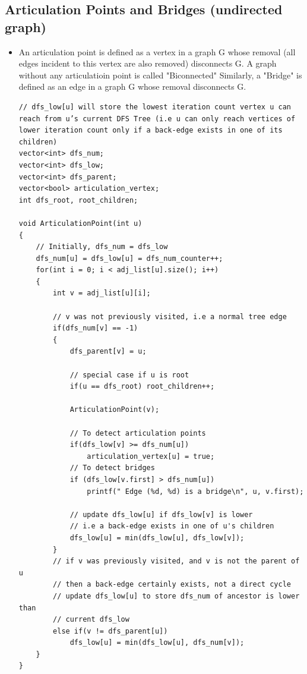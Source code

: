 \documentclass[8pt, a4paper, oneside, twocolumn]{extarticle}
\begin{document}
\subsection{Articulation Points and Bridges (undirected graph)}
\begin{itemize}
    \item An articulation point is defined as a vertex in a graph G whose removal (all edges incident to this vertex are also removed) disconnects G. A graph without any articulatioin point is called "Biconnected" Similarly, a "Bridge" is defined as an edge in a graph G whose removal disconnects G.
    \begin{verbatim}
// dfs_low[u] will store the lowest iteration count vertex u can reach from u’s current DFS Tree (i.e u can only reach vertices of lower iteration count only if a back-edge exists in one of its children)
vector<int> dfs_num;
vector<int> dfs_low;
vector<int> dfs_parent;
vector<bool> articulation_vertex;
int dfs_root, root_children;

void ArticulationPoint(int u)
{
    // Initially, dfs_num = dfs_low
    dfs_num[u] = dfs_low[u] = dfs_num_counter++;
    for(int i = 0; i < adj_list[u].size(); i++)
    {
        int v = adj_list[u][i];
        
        // v was not previously visited, i.e a normal tree edge
        if(dfs_num[v] == -1)
        {
            dfs_parent[v] = u;
            
            // special case if u is root
            if(u == dfs_root) root_children++;

            ArticulationPoint(v);
            
            // To detect articulation points
            if(dfs_low[v] >= dfs_num[u])
                articulation_vertex[u] = true;
            // To detect bridges
            if (dfs_low[v.first] > dfs_num[u])
                printf(" Edge (%d, %d) is a bridge\n", u, v.first);
            
            // update dfs_low[u] if dfs_low[v] is lower
            // i.e a back-edge exists in one of u's children
            dfs_low[u] = min(dfs_low[u], dfs_low[v]);
        }
        // if v was previously visited, and v is not the parent of u
        // then a back-edge certainly exists, not a direct cycle
        // update dfs_low[u] to store dfs_num of ancestor is lower than
        // current dfs_low
        else if(v != dfs_parent[u])
            dfs_low[u] = min(dfs_low[u], dfs_num[v]);
    }
}


\end{verbatim}
\end{itemize}
\end{document}
